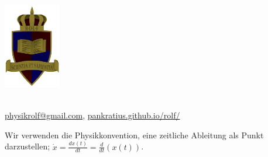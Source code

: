 \documentclass[a4paper]{article}
\begin{document}
	\vspace*{-2cm}
	\parbox{4cm}{\includegraphics[width=2.5cm]{../images/ROLF4.png}}
	\parbox{10.6cm}{ \\ \href{mailto:physikrolf@gmail.com}{physikrolf@gmail.com}, \url{pankratius.github.io/rolf/} \\ \vspace*{-.5cm} }
	\begin{framed}
		\small
	Wir verwenden die Physikkonvention, eine zeitliche Ableitung als Punkt darzustellen; $\dot{x} = \frac{dx\left(t\right)}{dt} = \frac{d}{dt}\left(x\left(t\right)\right)$.
	\end{framed}
	

\thispagestyle{empty}


\noindent



\end{document}
